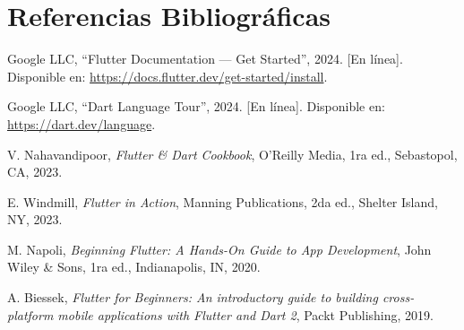 \documentclass[12pt,a4paper]{article}
\begin{document}
\section*{Referencias Bibliográficas}

\begin{enumerate}[label={[\arabic*]}]
    \item Google LLC, ``Flutter Documentation — Get Started'', 2024. [En línea]. Disponible en: \url{https://docs.flutter.dev/get-started/install}.
    \item Google LLC, ``Dart Language Tour'', 2024. [En línea]. Disponible en: \url{https://dart.dev/language}.
    \item V. Nahavandipoor, \textit{Flutter \& Dart Cookbook}, O'Reilly Media, 1ra ed., Sebastopol, CA, 2023.
    \item E. Windmill, \textit{Flutter in Action}, Manning Publications, 2da ed., Shelter Island, NY, 2023.
    \item M. Napoli, \textit{Beginning Flutter: A Hands-On Guide to App Development}, John Wiley \& Sons, 1ra ed., Indianapolis, IN, 2020.
    \item A. Biessek, \textit{Flutter for Beginners: An introductory guide to building cross-platform mobile applications with Flutter and Dart 2}, Packt Publishing, 2019.
\end{enumerate}
\end{document}
